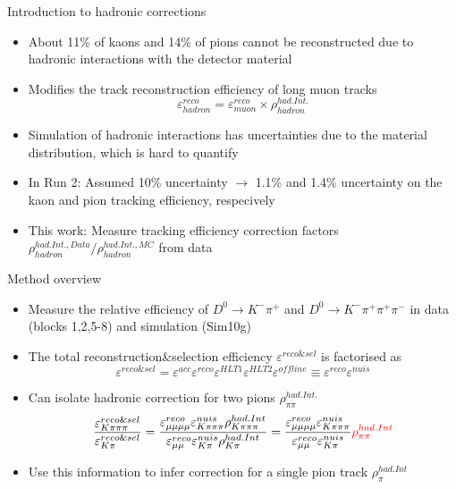 \documentclass[xcolor={dvipsnames}]{beamer}
\def\pip    {{\ensuremath{\pi^+}}\xspace}
\def\pim    {{\ensuremath{\pi^-}}\xspace}
\def\Km     {{\ensuremath{K^-}}\xspace}
\def\Dz     {{\ensuremath{D^0}}\xspace}
\def\DKpi   {\ensuremath{\Dz \rightarrow \Km \pip}\xspace}
\def\DKpipipi   {\ensuremath{\Dz \rightarrow \Km \pip \pip \pim}\xspace}
\begin{document}
\begin{frame}{Introduction to hadronic corrections}
  \begin{itemize}
    \item{About 11\% of kaons and 14\% of pions cannot be reconstructed due to hadronic interactions with the detector material}
    \item{Modifies the track reconstruction efficiency of long muon tracks}
    \begin{equation*}
      \varepsilon_{hadron}^{reco} = \varepsilon_{muon}^{reco} \times \rho^{had. Int.}_{hadron}
    \end{equation*}
    \item{Simulation of hadronic interactions has uncertainties due to the material distribution, which is hard to quantify}
    \item{In Run 2: Assumed 10\% uncertainty $\to$ 1.1\% and 1.4\% uncertainty on the kaon and pion tracking efficiency, respecively}
    \item{This work: Measure tracking efficiency correction factors $\rho^{had.Int.,Data}_{hadron}/\rho^{had.Int.,MC}_{hadron}$ from data}
  \end{itemize}
\end{frame}

\begin{frame}{Method overview}
  \begin{itemize}
  \item Measure the relative efficiency of \DKpi and \DKpipipi in data (blocks 1,2,5-8) and simulation (Sim10g)
  \item The total reconstruction\&selection efficiency $\varepsilon^{reco\&sel}$ is factorised as
    \begin{equation*}
      \varepsilon^{reco\&sel} = \varepsilon^{acc}\varepsilon^{reco}\varepsilon^{HLT1}\varepsilon^{HLT2}\varepsilon^{offline} \equiv \varepsilon^{reco}\varepsilon^{nuis}
    \end{equation*}
  \item Can isolate hadronic correction for two pions $\rho^{had.Int.}_{\pi\pi}$
    \begin{equation*}
      \frac{\varepsilon^{reco\&sel}_{K\pi\pi\pi}}{\varepsilon^{reco\&sel}_{K\pi}} = \frac{\varepsilon^{reco}_{\mu\mu\mu\mu}\varepsilon^{nuis}_{K\pi\pi\pi}\rho^{had.Int}_{K\pi\pi\pi}}{\varepsilon^{reco}_{\mu\mu}\varepsilon^{nuis}_{K\pi}\rho^{had.Int}_{K\pi}} = \frac{\varepsilon^{reco}_{\mu\mu\mu\mu}\varepsilon^{nuis}_{K\pi\pi\pi}}{\varepsilon^{reco}_{\mu\mu}\varepsilon^{nuis}_{K\pi}} \color{red}{\rho^{had.Int}_{\pi\pi}}
    \end{equation*}
  \item Use this information to infer correction for a single pion track $\rho^{had.Int}_\pi$
  \end{itemize}
\end{frame}
\end{document}
